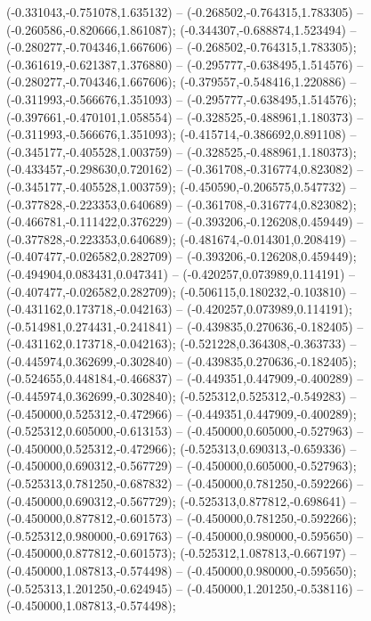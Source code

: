  (-0.331043,-0.751078,1.635132) -- (-0.268502,-0.764315,1.783305) -- (-0.260586,-0.820666,1.861087);
 (-0.344307,-0.688874,1.523494) -- (-0.280277,-0.704346,1.667606) -- (-0.268502,-0.764315,1.783305);
 (-0.361619,-0.621387,1.376880) -- (-0.295777,-0.638495,1.514576) -- (-0.280277,-0.704346,1.667606);
 (-0.379557,-0.548416,1.220886) -- (-0.311993,-0.566676,1.351093) -- (-0.295777,-0.638495,1.514576);
 (-0.397661,-0.470101,1.058554) -- (-0.328525,-0.488961,1.180373) -- (-0.311993,-0.566676,1.351093);
 (-0.415714,-0.386692,0.891108) -- (-0.345177,-0.405528,1.003759) -- (-0.328525,-0.488961,1.180373);
 (-0.433457,-0.298630,0.720162) -- (-0.361708,-0.316774,0.823082) -- (-0.345177,-0.405528,1.003759);
 (-0.450590,-0.206575,0.547732) -- (-0.377828,-0.223353,0.640689) -- (-0.361708,-0.316774,0.823082);
 (-0.466781,-0.111422,0.376229) -- (-0.393206,-0.126208,0.459449) -- (-0.377828,-0.223353,0.640689);
 (-0.481674,-0.014301,0.208419) -- (-0.407477,-0.026582,0.282709) -- (-0.393206,-0.126208,0.459449);
 (-0.494904,0.083431,0.047341) -- (-0.420257,0.073989,0.114191) -- (-0.407477,-0.026582,0.282709);
 (-0.506115,0.180232,-0.103810) -- (-0.431162,0.173718,-0.042163) -- (-0.420257,0.073989,0.114191);
 (-0.514981,0.274431,-0.241841) -- (-0.439835,0.270636,-0.182405) -- (-0.431162,0.173718,-0.042163);
 (-0.521228,0.364308,-0.363733) -- (-0.445974,0.362699,-0.302840) -- (-0.439835,0.270636,-0.182405);
 (-0.524655,0.448184,-0.466837) -- (-0.449351,0.447909,-0.400289) -- (-0.445974,0.362699,-0.302840);
 (-0.525312,0.525312,-0.549283) -- (-0.450000,0.525312,-0.472966) -- (-0.449351,0.447909,-0.400289);
 (-0.525312,0.605000,-0.613153) -- (-0.450000,0.605000,-0.527963) -- (-0.450000,0.525312,-0.472966);
 (-0.525313,0.690313,-0.659336) -- (-0.450000,0.690312,-0.567729) -- (-0.450000,0.605000,-0.527963);
 (-0.525313,0.781250,-0.687832) -- (-0.450000,0.781250,-0.592266) -- (-0.450000,0.690312,-0.567729);
 (-0.525313,0.877812,-0.698641) -- (-0.450000,0.877812,-0.601573) -- (-0.450000,0.781250,-0.592266);
 (-0.525312,0.980000,-0.691763) -- (-0.450000,0.980000,-0.595650) -- (-0.450000,0.877812,-0.601573);
 (-0.525312,1.087813,-0.667197) -- (-0.450000,1.087813,-0.574498) -- (-0.450000,0.980000,-0.595650);
 (-0.525313,1.201250,-0.624945) -- (-0.450000,1.201250,-0.538116) -- (-0.450000,1.087813,-0.574498);
